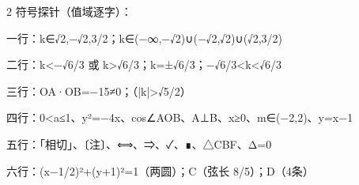 \documentclass[fontset=none]{ctexart}
\begin{document}
\begin{multicols}{2}
符号探针（值域逐字）：

一行：k∈{√2,−√2,3/2}；k∈(−∞,−√2)∪(−√2,√2)∪(√2,3/2)

二行：k<−√6/3 或 k>√6/3；k=±√6/3；−√6/3<k<√6/3

三行：OA·OB=−15≠0；（|k|>√5/2）

四行：0<a≤1、y²=−4x、cos∠AOB、A⊥B、x≥0、m∈(−2,2)、y=x−1

五行：「相切」、〔注〕、⟺、⇒、✓、∎、△CBF、Δ=0

六行：(x−1/2)²+(y+1)²=1（两圆）；C（弦长 8/5）；D（4条）
\end{multicols}
\end{document}
